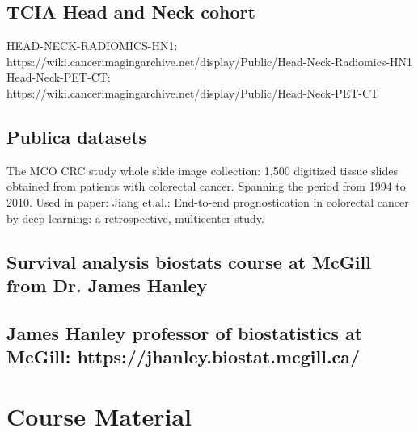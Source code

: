 \documentclass{article}%
\begin{document}
\subsection{TCIA Head and Neck cohort }%
\label{subsec:TCIAHeadandNeckcohort}%

%
HEAD{-}NECK{-}RADIOMICS{-}HN1: https://wiki.cancerimagingarchive.net/display/Public/Head{-}Neck{-}Radiomics{-}HN1 %
\newline%
\newline%
%
Head{-}Neck{-}PET{-}CT: https://wiki.cancerimagingarchive.net/display/Public/Head{-}Neck{-}PET{-}CT %
\newline%
\newline%
%
%
\newline%
\newline%
%
\subsection{Publica datasets }%
\label{subsec:Publicadatasets}%

%
The MCO CRC study whole slide image collection: 1,500 digitized tissue slides obtained from patients with colorectal cancer. Spanning the period from 1994 to 2010. %
\newline%
\newline%
%
Used in paper: Jiang et.al.: End{-}to{-}end prognostication in colorectal cancer by deep learning: a retrospective, multicenter study.%
\newline%
\newline%
%
\subsection{Survival analysis biostats course at McGill from Dr. James Hanley }%
\label{subsec:SurvivalanalysisbiostatscourseatMcGillfromDr.JamesHanley}%

%
\subsection{James Hanley professor of biostatistics at McGill: https://jhanley.biostat.mcgill.ca/ }%
\label{subsec:JamesHanleyprofessorofbiostatisticsatMcGillhttps//jhanley.biostat.mcgill.ca/}%

%
\section{Course Material}%
\label{sec:CourseMaterial}%

%
%
\newline%
\newline%
%
\end{document}
